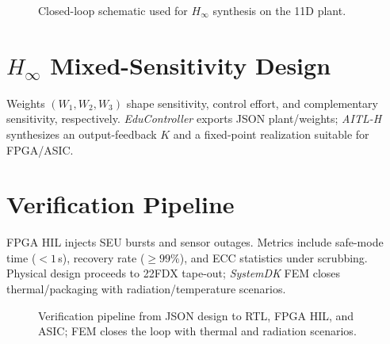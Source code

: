 \documentclass[conference]{IEEEtran}
\begin{document}
\begin{figure}[t]
\centering
{}
\caption{Closed-loop schematic used for $H_\infty$ synthesis on the 11D plant.}
\label{fig:loop}
\end{figure}

\section{$H_\infty$ Mixed-Sensitivity Design}
Weights $(W_1,W_2,W_3)$ shape sensitivity, control effort, and complementary sensitivity, respectively. \emph{EduController} exports JSON plant/weights; \emph{AITL-H} synthesizes an output-feedback $K$ and a fixed-point realization suitable for FPGA/ASIC.

\section{Verification Pipeline}
FPGA HIL injects SEU bursts and sensor outages. Metrics include safe-mode time ($<\!1$\,s), recovery rate ($\ge\!99\%$), and ECC statistics under scrubbing. Physical design proceeds to 22FDX tape-out; \emph{SystemDK} FEM closes thermal/packaging with radiation/temperature scenarios.

\begin{figure}[t]
\centering
{}
\caption{Verification pipeline from JSON design to RTL, FPGA HIL, and ASIC; FEM closes the loop with thermal and radiation scenarios.}
\label{fig:pipeline}
\end{figure}
\end{document}
